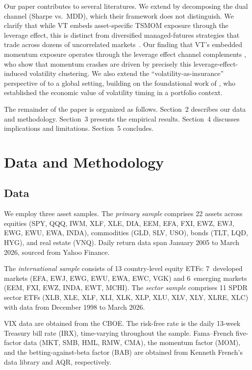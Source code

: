 Our paper contributes to several literatures. We extend \citet{hood2025} by decomposing the dual channel (Sharpe vs.\ MDD), which their framework does not distinguish. We clarify that while VT embeds asset-specific TSMOM exposure through the leverage effect, this is distinct from diversified managed-futures strategies that trade across dozens of uncorrelated markets~\citep{moskowitz2012, baltas2013}. Our finding that VT's embedded momentum exposure operates through the leverage effect channel complements \citet{daniel2016}, who show that momentum crashes are driven by precisely this leverage-effect-induced volatility clustering. We also extend the ``volatility-as-insurance'' perspective of \citet{lai2026a} to a global setting, building on the foundational work of \citet{fleming2001}, who established the economic value of volatility timing in a portfolio context.

The remainder of the paper is organized as follows. Section~2 describes our data and methodology. Section~3 presents the empirical results. Section~4 discusses implications and limitations. Section~5 concludes.


\section{Data and Methodology}

\subsection{Data}

We employ three asset samples. The \textit{primary sample} comprises 22 assets across equities (SPY, QQQ, IWM, XLF, XLE, DIA, EEM, EFA, FXI, EWZ, EWJ, EWG, EWU, EWA, INDA), commodities (GLD, SLV, USO), bonds (TLT, LQD, HYG), and real estate (VNQ). Daily return data span January 2005 to March 2026, sourced from Yahoo Finance.

The \textit{international sample} consists of 13 country-level equity ETFs: 7~developed markets (EFA, EWJ, EWG, EWU, EWA, EWC, VGK) and 6~emerging markets (EEM, FXI, EWZ, INDA, EWT, MCHI). The \textit{sector sample} comprises 11 SPDR sector ETFs (XLB, XLE, XLF, XLI, XLK, XLP, XLU, XLV, XLY, XLRE, XLC) with data from December 1998 to March 2026.

VIX data are obtained from the CBOE. The risk-free rate is the daily 13-week Treasury bill rate (IRX), time-varying throughout the sample. Fama--French five-factor data (MKT, SMB, HML, RMW, CMA), the momentum factor (MOM), and the betting-against-beta factor (BAB) are obtained from Kenneth French's data library and AQR, respectively.


